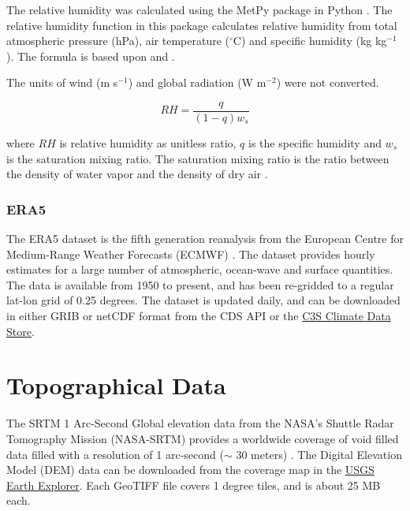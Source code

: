 The relative humidity was calculated using the MetPy package in Python \autocite{mayMetPyMeteorologicalPython2022}. The relative humidity function in this package calculates relative humidity from total atmospheric pressure (hPa), air temperature ($^{\circ}$C) and specific humidity (kg kg$^{-1}$). The formula is based upon \autocite{wallaceAtmosphericScienceIntroductory1977} and \autocite{salbyFundamentalsAtmosphericPhysics1996a}. 

The units of wind (m s$^{-1}$) and global radiation (W m$^{-2}$) were not converted. 

\begin{equation}
    RH = \frac{q}{(1 - q) w_{s}}
\end{equation}

where $RH$ is relative humidity as unitless ratio,  $q$ is the specific humidity and $w_{s}$ is the saturation mixing ratio. The saturation mixing ratio is the ratio between the density of water vapor and the density of dry air \autocite{kasaharaWeatherPredictionNumerical2003}. 


\subsubsection{ERA5}

The ERA5 dataset is the fifth generation reanalysis from the European Centre for Medium-Range Weather Forecasts (ECMWF) \autocite{hersbachERA5HourlyData2018}. The dataset provides hourly estimates for a large number of atmospheric, ocean-wave and surface quantities. The data is available from 1950 to present, and has been re-gridded to a regular lat-lon grid of 0.25 degrees. The dataset is updated daily, and can be downloaded in either GRIB or netCDF format from the CDS API or the \href{https://cds.climate.copernicus.eu/cdsapp#!/dataset/reanalysis-era5-single-levels?tab=overview}{C3S Climate Data Store}.

\section{Topographical Data}

The SRTM 1 Arc-Second Global elevation data from the NASA's Shuttle Radar Tomography Mission (NASA-SRTM) provides a worldwide coverage of void filled data filled with a resolution of 1 arc-second ($\sim$ 30 meters) \autocite{earthresourcesobservationandscienceeroscenterShuttleRadarTopography2017}. The Digital Elevation Model (DEM) data can be downloaded from the coverage map in the  \href{https://earthexplorer.usgs.gov/}{USGS Earth Explorer}. Each GeoTIFF file covers 1 degree tiles, and is about 25 MB each.

